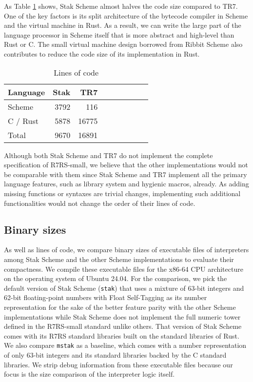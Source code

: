 \documentclass[sigplan, anonymous, review]{acmart}
\begin{document}
As Table \ref{table:loc} shows, Stak Scheme almost
halves the code size compared to TR7.
One of the key factors is its split architecture of the bytecode
compiler in Scheme and the virtual machine in Rust.
As a result, we can write the large part of the language processor in Scheme
itself that is more abstract and high-level than Rust or C.
The small virtual machine design borrowed from Ribbit Scheme also
contributes to reduce the code size of its implementation in Rust.

\begin{table}
  \begin{center}
    \caption{Lines of code}
    \label{table:loc}
    \begin{tabular}{l|rrrrrrrr}
      \hline
      Language & Stak & TR7  \\
      \hline
      Scheme & 3792 & 116 \\
      C / Rust & 5878 & 16775 \\
      Total & 9670 & 16891 \\
      \hline
    \end{tabular}
  \end{center}
\end{table}

Although both Stak Scheme and TR7 do not implement the complete
specification of R7RS-small, we believe that the other
implementations would not be comparable with them since
Stak Scheme and TR7 implement all the primary language features,
such as library system and hygienic macros, already.
As adding missing functions or syntaxes are trivial changes,
implementing such additional functionalities would not change the
order of their lines of code.

\subsection{Binary sizes}

As well as lines of code, we compare binary sizes of executable files of
interpreters among Stak Scheme and the other Scheme implementations
to evaluate their compactness.
We compile these executable files for the x86-64 CPU architecture on
the operating system of Ubuntu 24.04.
For the comparison, we pick the default version of Stak Scheme (\texttt{stak})
that uses a mixture of 63-bit integers and 62-bit floating-point
numbers with Float Self-Tagging \cite{floatselftag} as its number
representation for the sake of the better feature parity with
the other Scheme implementations while Stak Scheme does not implement
the full numeric tower defined in the R7RS-small standard unlike others.
That version of Stak Scheme comes with its R7RS standard libraries built on
the standard libraries of Rust.
We also compare \texttt{mstak} as a baseline, which comes with a number
representation of only 63-bit integers and its standard libraries backed
by the C standard libraries.
We strip debug information from these executable files because
our focus is the size comparison of the interpreter logic itself.
\end{document}

